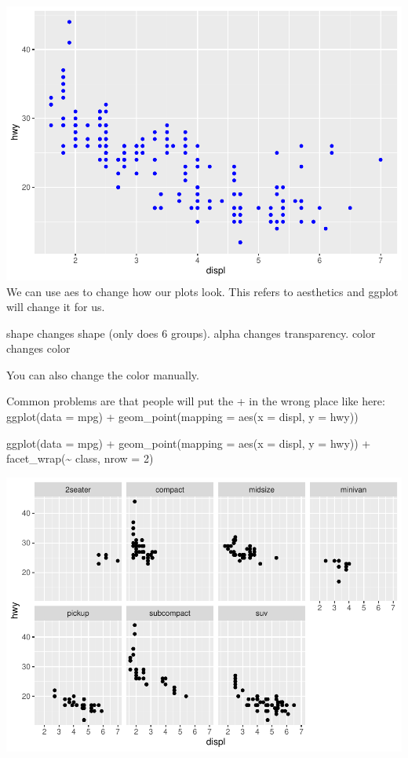 \documentclass[
]{article}
\newenvironment{Shaded}{\begin{snugshade}}{\end{snugshade}}
\newcommand{\AttributeTok}[1]{\textcolor[rgb]{0.77,0.63,0.00}{#1}}
\newcommand{\DecValTok}[1]{\textcolor[rgb]{0.00,0.00,0.81}{#1}}
\newcommand{\FunctionTok}[1]{\textcolor[rgb]{0.00,0.00,0.00}{#1}}
\newcommand{\NormalTok}[1]{#1}
\newcommand{\SpecialCharTok}[1]{\textcolor[rgb]{0.00,0.00,0.00}{#1}}
\begin{document}
\includegraphics{Journal_files/figure-latex/unnamed-chunk-39-5.pdf} We
can use aes to change how our plots look. This refers to aesthetics and
ggplot will change it for us.

shape changes shape (only does 6 groups). alpha changes transparency.
color changes color

You can also change the color manually.

Common problems are that people will put the + in the wrong place like
here: ggplot(data = mpg) + geom\_point(mapping = aes(x = displ, y =
hwy))

\begin{Shaded}
\begin{Highlighting}[]
\FunctionTok{ggplot}\NormalTok{(}\AttributeTok{data =}\NormalTok{ mpg) }\SpecialCharTok{+} 
  \FunctionTok{geom\_point}\NormalTok{(}\AttributeTok{mapping =} \FunctionTok{aes}\NormalTok{(}\AttributeTok{x =}\NormalTok{ displ, }\AttributeTok{y =}\NormalTok{ hwy)) }\SpecialCharTok{+} 
  \FunctionTok{facet\_wrap}\NormalTok{(}\SpecialCharTok{\textasciitilde{}}\NormalTok{ class, }\AttributeTok{nrow =} \DecValTok{2}\NormalTok{)}
\end{Highlighting}
\end{Shaded}

\includegraphics{Journal_files/figure-latex/unnamed-chunk-40-1.pdf}
\end{document}

